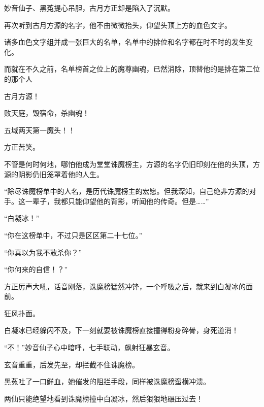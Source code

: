 \begin{this_body}
妙音仙子、黑菟提心吊胆，古月方正却是陷入了沉默。

再次听到古月方源的名字，他不由微微抬头，仰望头顶上方的血色文字。

诸多血色文字组并成一张巨大的名单，名单中的排位和名字都在时不时的发生变化。

而就在不久之前，名单榜首之位上的魔尊幽魂，已然消除，顶替他的是排在第二位的那个人

古月方源！

败天庭，毁宿命，杀幽魂！

五域两天第一魔头！！

方正苦笑。

不管是何时何地，哪怕他成为堂堂诛魔榜主，方源的名字仍旧印刻在他的头顶，方源的阴影仍旧笼罩着他的人生。

“除尽诛魔榜单中的人名，是历代诛魔榜主的宏愿。但我深知，自己绝非方源的对手。这一辈子，我都只能仰望他的背影，听闻他的传奇。但是……”

“白凝冰！”

“你在这榜单中，不过只是区区第二十七位。”

“你真以为我不敢杀你？”

“你何来的自信！？”

方正厉声大吼，话音刚落，诛魔榜猛然冲锋，一个呼吸之后，就来到白凝冰的面前。

狂风扑面。

白凝冰已经躲闪不及，下一刻就要被诛魔榜直接撞得粉身碎骨，身死道消！

“不！”妙音仙子心中暗呼，七手联动，飙射狂暴玄音。

玄音重重，后发先至，却拦截不住诛魔榜。

黑菟吐了一口鲜血，她催发的阻拦手段，同样被诛魔榜蛮横冲溃。

两仙只能绝望地看到诛魔榜撞中白凝冰，然后狠狠地碾压过去！

\end{this_body}

